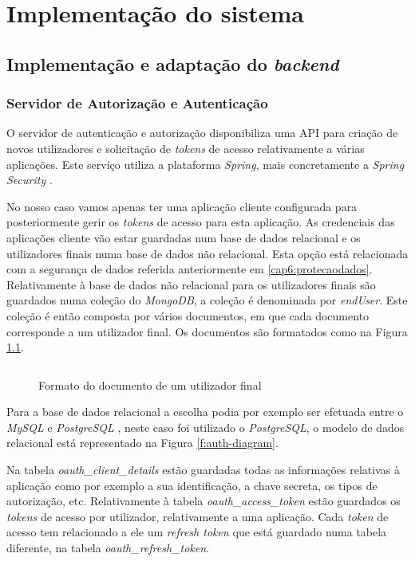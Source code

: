 \chapter{Implementação do sistema}

\section{Implementação e adaptação do \textit{backend}}

\subsection{Servidor de Autorização e Autenticação}
O servidor de autenticação e autorização disponibiliza uma \gls{API} para criação de novos utilizadores e solicitação de \textit{tokens} de acesso relativamente a várias aplicações. Este serviço utiliza a plataforma \textit{Spring}, mais concretamente a \textit{Spring Security} \cite{spring-framework}. \par 
No nosso caso vamos apenas ter uma aplicação cliente configurada para posteriormente gerir os \textit{tokens} de acesso para esta aplicação. As credenciais das aplicações cliente vão estar guardadas num base de dados relacional e os utilizadores finais numa base de dados não relacional. Esta opção está relacionada com a segurança de dados referida anteriormente em \ref{cap6:protecaodados}. 
Relativamente à base de dados não relacional para os utilizadores finais são guardados numa coleção do \textit{MongoDB}\cite{mongodb}, a coleção é denominada por \textit{endUser}. Este coleção é então composta por vários documentos, em que cada documento corresponde a um utilizador final. Os documentos são formatados como na Figura \ref{f:endUserCode}.

\begin{figure}[H]
\inputminted[fontsize=\scriptsize]{json}{code/endUser.json}
\caption[Formato do documento de um utilizador final]{Formato do documento de um utilizador final}
\label{f:endUserCode}
\end{figure}

Para a base de dados relacional a escolha podia por exemplo ser efetuada entre o  \textit{MySQL} \cite{mysql} e  \textit{PostgreSQL} \cite{postgresql}, neste caso foi utilizado o  \textit{PostgreSQL}, o modelo de dados relacional está representado na Figura \ref{f:auth-diagram}. \par 
Na tabela  \textit{oauth\_client\_details} estão guardadas todas as informações relativas à aplicação como por exemplo a sua identificação, a chave secreta, os tipos de autorização, etc. Relativamente à tabela  \textit{oauth\_access\_token} estão guardados os  \textit{tokens} de acesso por utilizador, relativamente a uma aplicação. Cada  \textit{token} de acesso tem relacionado a ele  um  \textit{refresh token} que está guardado numa tabela diferente, na tabela  \textit{oauth\_refresh\_token}.

